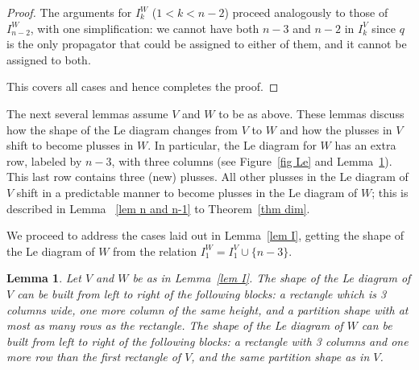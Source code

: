 \documentclass[11pt]{article}
\newtheorem{lem}[thm]{Lemma}
\theoremstyle{remark}
\theoremstyle{definition}
\begin{document}
\begin{proof}
The arguments for $I_k^{W}$ ($1< k < n-2$) proceed analogously to those of $I_{n-2}^{W}$, with one simplification: we cannot have both $n-3$ and $n-2$ in $I_k^{V}$ since $q$ is the only propagator that could be assigned to either of them, and it cannot be assigned to both.

This covers all cases and hence completes the proof.
\end{proof}

The next several lemmas assume $V$ and $W$ to be as above. These lemmas discuss how the shape of the Le diagram changes from $V$ to $W$ and how the plusses in $V$ shift to become plusses in $W$. In particular, the Le diagram for $W$ has an extra row, labeled by $n-3$, with three columns (see Figure~\ref{fig Le} and Lemma~\ref{lem shape}). This last row contains three (new) plusses. All other plusses in the Le diagram of $V$ shift in a predictable manner to become plusses in the Le diagram of $W$; this is described in Lemma ~\ref{lem n and n-1} to Theorem~\ref{thm dim}.

We proceed to address the cases laid out in Lemma~\ref{lem I}, getting the shape of the Le diagram of $W$ from the relation $I_1^W= I_1^V \cup \{n-3\}$. 

\begin{lem}\label{lem shape}
  Let $V$ and $W$ be as in Lemma~\ref{lem I}.
  The shape of the Le diagram of $V$ can be built from left to right of the following blocks: a rectangle which is 3 columns wide, one more column of the same height, and a partition shape with at most as many rows as the rectangle.
  The shape of the Le diagram of $W$ can be built from left to right of the following blocks: a rectangle with 3 columns and one more row than the first rectangle of $V$, and the same partition shape as in $V$.
\end{lem}
\end{document}
